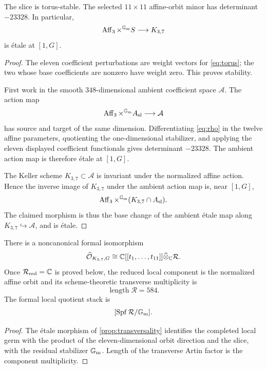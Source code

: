 \documentclass[11pt,reqno]{amsart}
\begin{document}
\begin{proposition}[Transversality]
\label{prop:transversality}
The slice is torus-stable.  The selected \(11\times11\) affine-orbit minor
has determinant \(-23328\).  In particular,
\[
\operatorname{Aff}_3\times^{\mathbb G_{\mathrm m}}S\longrightarrow K_{3,7}
\]
is \'{e}tale at \([1,G]\).
\end{proposition}

\begin{proof}
The eleven coefficient perturbations are weight vectors for
\eqref{eq:torus}; the two whose base coefficients are nonzero have weight
zero.  This proves stability.

First work in the smooth \(348\)-dimensional ambient coefficient space
\(\mathcal A\).  The action map
\[
\operatorname{Aff}_3\times^{\mathbb G_{\mathrm m}}A_{\mathrm{sl}}\longrightarrow\mathcal A
\]
has source and target of the same dimension.  Differentiating
\eqref{eq:rho} in the twelve affine parameters, quotienting the
one-dimensional stabilizer, and applying the eleven displayed coefficient
functionals gives determinant \(-23328\).  The ambient action map is
therefore \'{e}tale at \([1,G]\).

The Keller scheme \(K_{3,7}\subset\mathcal A\) is invariant under the
normalized affine action.  Hence the inverse image of \(K_{3,7}\) under the
ambient action map is, near \([1,G]\),
\[
\operatorname{Aff}_3\times^{\mathbb G_{\mathrm m}}(K_{3,7}\cap A_{\mathrm{sl}}).
\]
The claimed morphism is thus the base change of the ambient \'{e}tale map
along \(K_{3,7}\hookrightarrow\mathcal A\), and is \'{e}tale.
\end{proof}

\begin{corollary}
\label{cor:local-product}
There is a noncanonical formal isomorphism
\[
\widehat{\mathcal O}_{K_{3,7},G}
\cong
\mathbb C[[t_1,\ldots,t_{11}]]
\widehat\otimes_\mathbb C\mathcal R.
\]
Once \(\mathcal R_{\mathrm{red}}=\mathbb C\) is proved below, the reduced local
component is the normalized affine orbit and its scheme-theoretic
transverse multiplicity is
\[
\operatorname{length}\mathcal R=584.
\]
The formal local quotient stack is
\[
[\operatorname{Spf}\mathcal R/\mathbb G_{\mathrm m}].
\]
\end{corollary}

\begin{proof}
The \'{e}tale morphism of \cref{prop:transversality} identifies the completed
local germ with the product of the eleven-dimensional orbit direction and
the slice, with the residual stabilizer \(\mathbb G_{\mathrm m}\).  Length of the transverse
Artin factor is the component multiplicity.
\end{proof}
\end{document}
